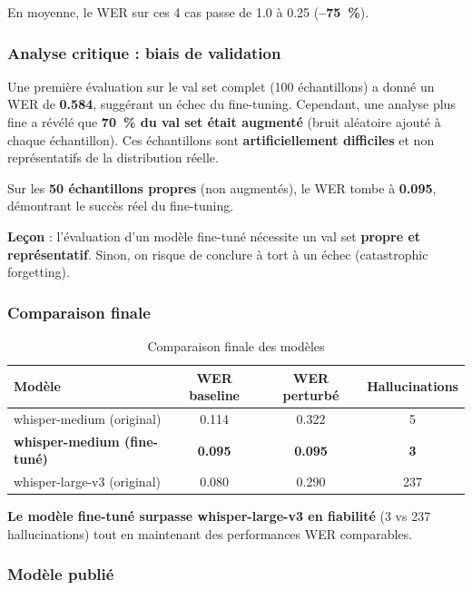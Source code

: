 \documentclass[11pt,a4paper]{article}
\begin{document}
En moyenne, le WER sur ces 4 cas passe de 1.0 à 0.25 (\textbf{--75~\%}).

\subsubsection{Analyse critique : biais de validation}

Une première évaluation sur le val set complet (100 échantillons) a donné
un WER de \textbf{0.584}, suggérant un échec du fine-tuning.
Cependant, une analyse plus fine a révélé que \textbf{70~\% du val set
	était augmenté} (bruit aléatoire ajouté à chaque échantillon). Ces
échantillons sont \textbf{artificiellement difficiles} et non représentatifs
de la distribution réelle.

Sur les \textbf{50 échantillons propres} (non augmentés), le WER tombe à
\textbf{0.095}, démontrant le succès réel du fine-tuning.

\textbf{Leçon} : l'évaluation d'un modèle fine-tuné nécessite un val set
\textbf{propre et représentatif}. Sinon, on risque de conclure à tort à
un échec (catastrophic forgetting).

\subsubsection{Comparaison finale}

\begin{table}[h]
	\centering
	\caption{Comparaison finale des modèles}
	\label{tab:final_comparison}
	\begin{tabular}{lccc}
		\toprule
		\textbf{Modèle} & \textbf{WER baseline} & \textbf{WER perturbé} & \textbf{Hallucinations} \\
		\midrule
		whisper-medium (original) & 0.114 & 0.322 & 5 \\
		\textbf{whisper-medium (fine-tuné)} & \textbf{0.095} & \textbf{0.095} & \textbf{3} \\
		whisper-large-v3 (original) & 0.080 & 0.290 & 237 \\
		\bottomrule
	\end{tabular}
\end{table}

\textbf{Le modèle fine-tuné surpasse whisper-large-v3 en fiabilité}
(3 vs 237 hallucinations) tout en maintenant des performances WER
comparables.

\subsubsection{Modèle publié}
\end{document}
